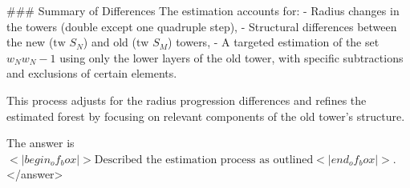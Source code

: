 ### Summary of Differences  
The estimation accounts for:  
- Radius changes in the towers (double except one quadruple step),  
- Structural differences between the new (\( \text{tw } S_N \)) and old (\( \text{tw } S_M \)) towers,  
- A targeted estimation of the set \( w_N w_N-1 \) using only the lower layers of the old tower, with specific subtractions and exclusions of certain elements.  

This process adjusts for the radius progression differences and refines the estimated forest by focusing on relevant components of the old tower’s structure.  

The answer is \(<|begin_of_box|>\text{Described the estimation process as outlined}<|end_of_box|>\).</answer>